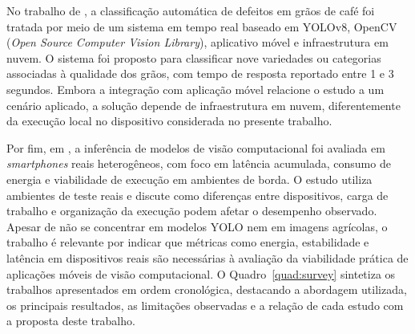 \documentclass[artigo,times,capa]{iftex2024}
\begin{document}
No trabalho de \textcite{Thai2024Coffee}, a classificação automática de defeitos
em grãos de café foi tratada por meio de um sistema em tempo real baseado em
YOLOv8, OpenCV (\textit{Open Source Computer Vision Library}), aplicativo móvel e infraestrutura em nuvem. O sistema foi
proposto para classificar nove variedades ou categorias associadas à qualidade
dos grãos, com tempo de resposta reportado entre 1 e 3 segundos. Embora a
integração com aplicação móvel relacione o estudo a um cenário aplicado, a
solução depende de infraestrutura em nuvem, diferentemente da execução
local no dispositivo considerada no presente trabalho.

Por fim, em \textcite{Hirsch2025Exploring}, a inferência de modelos de visão
computacional foi avaliada em \textit{smartphones} reais heterogêneos, com foco
em latência acumulada, consumo de energia e viabilidade de execução em
ambientes de borda. O estudo utiliza ambientes de teste reais e discute como
diferenças entre dispositivos, carga de trabalho e organização da execução podem
afetar o desempenho observado. Apesar de não se concentrar em modelos \ac{YOLO}
nem em imagens agrícolas, o trabalho é relevante por indicar que métricas como
energia, estabilidade e latência em dispositivos reais são necessárias à
avaliação da viabilidade prática de aplicações móveis de visão computacional. O Quadro~\ref{quad:survey} sintetiza os trabalhos apresentados em ordem
cronológica, destacando a abordagem utilizada, os principais resultados,
as limitações observadas e a relação de cada estudo com a proposta deste
trabalho.

\FloatBarrier
\end{document}
